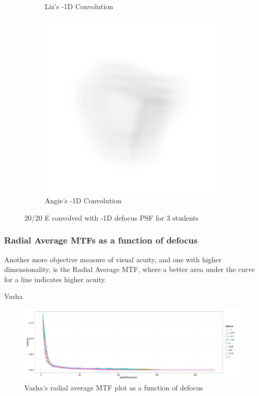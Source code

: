 \documentclass{article}
\begin{document}
\begin{figure}[H]
\begin{subfigure}{.3\textwidth}
  \caption{Liz's -1D Convolution}
  \label{fig:lizn1d}
\end{subfigure}
\begin{subfigure}{.3\textwidth}
  \centering
  \includegraphics[width=1\linewidth]{Angie_R_0526_1_500_zer_-1_5_PSF_convE.png}
  \caption{Angie's -1D Convolution}
  \label{fig:angien1d}
\end{subfigure}

\caption{20/20 E convolved with -1D defocus PSF for 3 students}
\label{fig:Defocus_n1D}
\end{figure}

\clearpage

\subsubsection{Radial Average MTFs as a function of defocus}

Another more objective measure of visual acuity, and one with higher dimensionality, is the Radial Average MTF, where a better area under the curve for a line indicates higher acuity.

Vasha
\begin{figure}[H]
  \centering
    \includegraphics[width=1\linewidth]{vasha_dmtfs.pdf}
  \caption{Vasha's radial average MTF plot as a function of defocus}
  \label{fig:vmtfs}
\end{figure}
\end{document}
